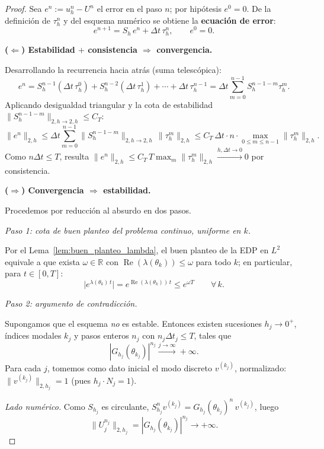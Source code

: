 \documentclass[a4paper,11pt]{report}
\begin{document}
\begin{proof}
Sea $e^n:=u_h^n-U^n$ el error en el paso $n$; por hipótesis $e^0=0$. De la definición de $\tau_h^n$ y del esquema numérico se obtiene la \textbf{ecuación de error}:
\[
  e^{n+1}=S_h\,e^n+\Delta t\,\tau_h^n,\qquad e^0=0.
\]

\medskip
\noindent\textbf{($\Leftarrow$) Estabilidad $+$ consistencia $\Rightarrow$ convergencia.}

Desarrollando la recurrencia hacia atrás (suma telescópica):
\[
  e^n = S_h^{n-1}(\Delta t\,\tau_h^0) + S_h^{n-2}(\Delta t\,\tau_h^1) + \cdots + \Delta t\,\tau_h^{n-1}
      = \Delta t\sum_{m=0}^{n-1}S_h^{n-1-m}\tau_h^m.
\]
Aplicando desigualdad triangular y la cota de estabilidad $\|S_h^{n-1-m}\|_{2,h\to2,h}\le C_T$:
\[
  \|e^n\|_{2,h}
  \le \Delta t\sum_{m=0}^{n-1}\|S_h^{n-1-m}\|_{2,h\to2,h}\,\|\tau_h^m\|_{2,h}
  \le C_T\,\Delta t\cdot n\cdot\max_{0\le m\le n-1}\|\tau_h^m\|_{2,h}.
\]
Como $n\Delta t\le T$, resulta $\|e^n\|_{2,h}\le C_T\,T\max_{m}\|\tau_h^m\|_{2,h}\xrightarrow{h,\Delta t\to0}0$ por consistencia.

\medskip
\noindent\textbf{($\Rightarrow$) Convergencia $\Rightarrow$ estabilidad.}

Procedemos por reducción al absurdo en dos pasos.

\medskip
\noindent\emph{Paso 1: cota de buen planteo del problema continuo, uniforme en $k$.}

Por el Lema~\ref{lem:buen_planteo_lambda}, el buen planteo de la EDP en $L^2$ equivale a que exista $\omega\in\mathbb{R}$ con $\operatorname{Re}(\lambda(\theta_k))\le\omega$ para todo $k$; en particular, para $t\in[0,T]$:
\[
  \bigl|e^{\lambda(\theta_k)\,t}\bigr|
  =e^{\operatorname{Re}(\lambda(\theta_k))\,t}
  \le e^{\omega T}
  \qquad\forall\,k.\tag{BP}
\]

\medskip
\noindent\emph{Paso 2: argumento de contradicción.}

Supongamos que el esquema \emph{no} es estable. Entonces existen sucesiones $h_j\to0^+$, índices modales $k_j$ y pasos enteros $n_j$ con $n_j\Delta t_j\le T$, tales que
\[
  |G_{h_j}(\theta_{k_j})|^{n_j}\xrightarrow{j\to\infty}+\infty.
\]
Para cada $j$, tomemos como dato inicial el modo discreto $v^{(k_j)}$, normalizado: $\|v^{(k_j)}\|_{2,h_j}=1$ (pues $h_j\cdot N_j=1$).

\noindent\emph{Lado numérico.} Como $S_{h_j}$ es circulante, $S_{h_j}^nv^{(k_j)}=G_{h_j}(\theta_{k_j})^n\,v^{(k_j)}$, luego
\[
  \|U_j^{n_j}\|_{2,h_j}=|G_{h_j}(\theta_{k_j})|^{n_j}\to+\infty.
\]


\end{proof}
\end{document}

